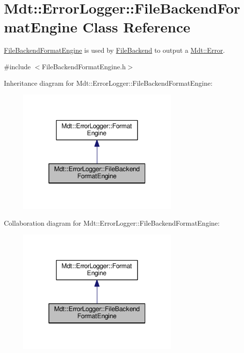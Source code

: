 \hypertarget{class_mdt_1_1_error_logger_1_1_file_backend_format_engine}{}\section{Mdt\+:\+:Error\+Logger\+:\+:File\+Backend\+Format\+Engine Class Reference}
\label{class_mdt_1_1_error_logger_1_1_file_backend_format_engine}


\hyperlink{class_mdt_1_1_error_logger_1_1_file_backend_format_engine}{File\+Backend\+Format\+Engine} is used by \hyperlink{class_mdt_1_1_error_logger_1_1_file_backend}{File\+Backend} to output a \hyperlink{class_mdt_1_1_error}{Mdt\+::\+Error}.  




{\ttfamily \#include $<$File\+Backend\+Format\+Engine.\+h$>$}



Inheritance diagram for Mdt\+:\+:Error\+Logger\+:\+:File\+Backend\+Format\+Engine\+:\nopagebreak
\begin{figure}[H]
\begin{center}
\leavevmode
\includegraphics[width=229pt]{class_mdt_1_1_error_logger_1_1_file_backend_format_engine__inherit__graph}
\end{center}
\end{figure}


Collaboration diagram for Mdt\+:\+:Error\+Logger\+:\+:File\+Backend\+Format\+Engine\+:\nopagebreak
\begin{figure}[H]
\begin{center}
\leavevmode
\includegraphics[width=229pt]{class_mdt_1_1_error_logger_1_1_file_backend_format_engine__coll__graph}
\end{center}
\end{figure}

